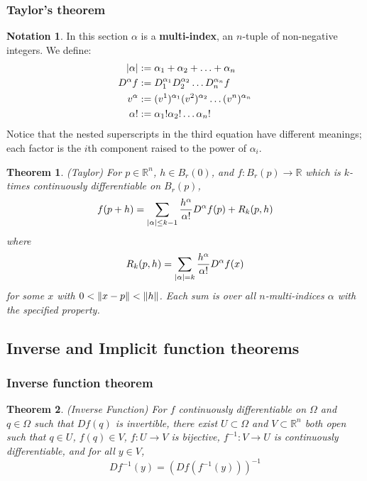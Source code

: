 \documentclass[12pt]{article}
\newtheorem{thm}{Theorem}[section]
\theoremstyle{definition}
\newtheorem*{not*}{Notation}
\DeclarePairedDelimiter\abs{\lvert}{\rvert}
\DeclarePairedDelimiter\length{\lVert}{\rVert}
\newcommand{\R}{\mathbb{R}}
\begin{document}
\subsubsection{Taylor's theorem}

\begin{not*}
  In this section $\alpha$ is a \textbf{multi-index}, an $n$-tuple of non-negative integers.
  We define:
  \begin{align*}
    \abs{\alpha} &:= \alpha_1 + \alpha_2 + \ldots + \alpha_n\\
    D^{\alpha}f &:= D_1^{\alpha_1}D_2^{\alpha_2}\ldots D_n^{\alpha_n}f\\
    v^{\alpha} &:= (v^1)^{\alpha_1}(v^2)^{\alpha_2}\ldots(v^n)^{\alpha_n}\\
    \alpha! &:= \alpha_1!\alpha_2!\ldots\alpha_n!
  \end{align*}
  Notice that the nested superscripts in the third equation have different meanings; each factor is the $i$th component raised to the power of $\alpha_i$.
\end{not*}

\begin{thm}
  (Taylor)
  For $p \in \R^n$, $h \in B_r(0)$, and $f : B_r(p) \to \R$ which is $k$-times continuously differentiable on $B_r(p)$,
  $$f(p + h) = \sum_{\abs{\alpha} \leq k - 1}\frac{h^{\alpha}}{\alpha!}D^{\alpha}f(p) + R_k(p, h)$$
  where
  $$R_k(p, h) = \sum_{\abs{\alpha} = k}\frac{h^{\alpha}}{\alpha!}D^{\alpha}f(x)$$
  for some $x$ with $0 < \length{x - p} < \length{h}$.
  Each sum is over all $n$-multi-indices $\alpha$ with the specified property.
\end{thm}

\subsection{Inverse and Implicit function theorems}

\subsubsection{Inverse function theorem}

\begin{thm}
  (Inverse Function)
  For $f$ continuously differentiable on $\Omega$ and $q \in \Omega$ such that $Df(q)$ is invertible, there exist $U \subset \Omega$ and $V \subset \R^n$ both open such that $q \in U$, $f(q) \in V$, $f : U \to V$ is bijective, $f^{-1} : V \to U$ is continuously differentiable, and for all $y \in V$,
  $$Df^{-1}(y) = \left(Df(f^{-1}(y))\right)^{-1}$$
\end{thm}
\end{document}
